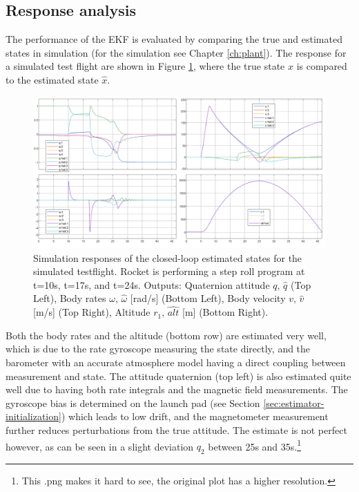 \subsection{Response analysis}
The performance of the EKF is evaluated by comparing the true and estimated states in simulation (for the simulation see Chapter \ref{ch:plant}).
The response for a simulated test flight are shown in Figure \ref{fig:estimator-response}, where the true state $x$ is compared to the estimated state $\hat x$.
\begin{figure}[ht!]
    \centering
    \includegraphics[width=\textwidth]{images-design/estimator-simulation.png}
    \caption[Closed-loop estimation responses]{Simulation responses of the closed-loop estimated states for the simulated testflight. Rocket is performing a step roll program at t=10s, t=17s, and t=24s. Outputs: Quaternion attitude $q, \, \hat q$ (Top Left),  Body rates $\omega, \, \hat \omega$ [rad/s] (Bottom Left), Body velocity $v, \, \hat v$ [m/s] (Top Right), Altitude $r_1, \, \hat {alt}$ [m] (Bottom Right).}
    \label{fig:estimator-response}
\end{figure}
Both the body rates and the altitude (bottom row) are estimated very well, which is due to the rate gyroscope measuring the state directly, and the barometer with an accurate atmosphere model having a direct coupling between measurement and state.
The attitude quaternion (top left) is also estimated quite well due to having both rate integrals and the magnetic field measurements. 
The gyroscope bias is determined on the launch pad (see Section \ref{sec:estimator-initialization}) which leads to low drift, and the magnetometer measurement further reduces perturbations from the true attitude.
The estimate is not perfect however, as can be seen in a slight deviation $q_2$ between 25s and 35s.\footnote{This .png makes it hard to see, the original plot has a higher resolution.}
